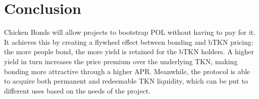 \documentclass{article}
\begin{document}
\section{Conclusion}
Chicken Bonds will allow projects to bootstrap POL without having to pay for it. It achieves this by creating a flywheel effect between bonding and bTKN pricing: the more people bond, the more yield is retained for the bTKN holders. A higher yield in turn increases the price premium over the underlying TKN, making bonding more attractive through a higher APR. Meanwhile, the protocol is able to acquire both permanent and redeemable TKN liquidity, which can be put to different uses based on the needs of the project.
\end{document}
